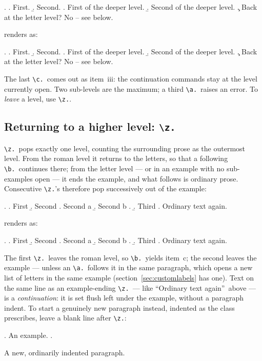 \documentclass[11pt,a4paper]{article}
\newcommand{\cs}[1]{\texttt{\textbackslash #1}}
\newcommand{\rendered}{\par\medskip\noindent\textcolor{gray!70}{\small renders as:}\par\nobreak\smallskip}
\newcommand{\afterex}{\par\addvspace{\medskipamount}}
\begin{document}
\begin{code}
\ex.
\a. First.
\b. Second.
\a. First of the deeper level.
\b. Second of the deeper level.
\c. Back at the letter level? No -- see below.
\end{code}

\rendered
\ex.
\a. First.
\b. Second.
\a. First of the deeper level.
\b. Second of the deeper level.
\c. Back at the letter level? No -- see below.

\afterex
The last \cs{c.}\ comes out as item~iii: the continuation commands stay
at the level currently open. Two sub-levels are the maximum; a third
\cs{a.}\ raises an error. To \emph{leave} a level, use \cs{z.}.

\subsection{Returning to a higher level: \cs{z.}}\label{sec:z}

\cs{z.}\ pops exactly one level, counting the surrounding prose as the
outermost level. From the roman level it returns to the letters, so that
a following \cs{b.}\ continues there; from the letter level --- or in an
example with no sub-examples open --- it ends the example, and what
follows is ordinary prose. Consecutive \cs{z.}'s therefore pop
successively out of the example:

\begin{code}
\ex.
\a. First
\b. Second
\a. Second a
\b. Second b
\z.
\b. Third
\z.
Ordinary text again.
\end{code}

\rendered
\ex.
\a. First
\b. Second
\a. Second a
\b. Second b
\z.
\b. Third
\z.
Ordinary text again.

\afterex
The first \cs{z.}\ leaves the roman level, so \cs{b.}\ yields item~c; the
second leaves the example --- unless an \cs{a.}\ follows it in the same
paragraph, which opens a new list of letters in the same example
(section~\ref{sec:customlabels} has one). Text on the same line as an example-ending \cs{z.}\
--- like ``Ordinary text again''\ above --- is a \emph{continuation}: it is
set flush left under the example, without a paragraph indent. To start a
genuinely new paragraph instead, indented as the class prescribes, leave a
blank line after \cs{z.}:

\begin{code}
\ex. An example. \z.

A new, ordinarily indented paragraph.
\end{code}
\end{document}
